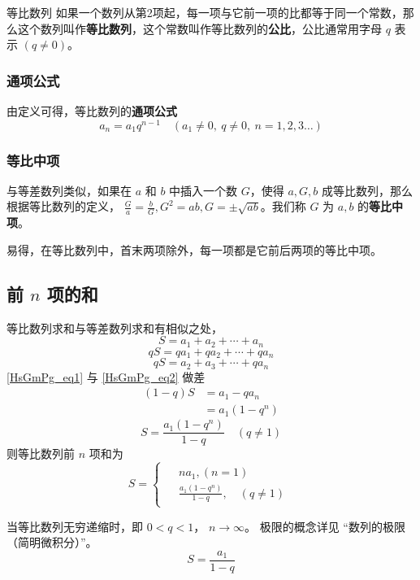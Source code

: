 

\begin{definition}{等比数列}
如果一个数列从第2项起，每一项与它前一项的比都等于同一个常数，那么这个数列叫作\textbf{等比数列}，这个常数叫作等比数列的\textbf{公比}，公比通常用字母 $q$ 表示 $(q\ne 0)$。
\end{definition}

\subsubsection{通项公式}
由定义可得，等比数列的\textbf{通项公式}
\begin{equation}
a_n = a_1 q^{n-1} \quad (a_1 \ne 0,\ q\ne 0,\ n=1,2,3\dots)
\end{equation}

\subsubsection{等比中项}
与等差数列类似，如果在 $a$ 和 $b$ 中插入一个数 $G$，使得 $a,G,b$ 成等比数列，那么根据等比数列的定义， $\frac{G}{a} = \frac{b}{G},G^2 = ab,G = \pm \sqrt{ab}$。我们称 $G$ 为 $a,b$ 的\textbf{等比中项}。

易得，在等比数列中，首末两项除外，每一项都是它前后两项的等比中项。

\subsection{前 $n$ 项的和}
等比数列求和与等差数列求和有相似之处，
\begin{equation}\label{HsGmPg_eq1}
S = a_1 + a_2 + \cdots + a_n
\end{equation}
\begin{equation}
qS = qa_1 + qa_2 + \cdots + qa_n
\end{equation}
\begin{equation}\label{HsGmPg_eq2}
qS= a_2 + a_3 + \cdots + qa_n
\end{equation}
\autoref{HsGmPg_eq1} 与 \autoref{HsGmPg_eq2} 做差
\begin{equation}
\begin{aligned}
(1 - q)S &= a_1 - qa_n\\
&= a_1(1 - q^n)
\end{aligned}
\end{equation}
\begin{equation}
S = \frac{a_1(1-q^n)}{1-q} \quad (q\neq 1)
\end{equation}
则等比数列前 $n$ 项和为
\begin{equation}
S = 
\begin{cases}
\begin{aligned}
&na_1,(n = 1) \\
&\frac{a_1(1-q^n)}{1-q},\quad (q \neq 1)
\end{aligned}
\end{cases}
\end{equation}

当等比数列无穷递缩时，即 $0<q<1$， $n\rightarrow \infty$。 极限的概念详见 “数列的极限（简明微积分）”。
\begin{equation}
S = \frac{a_1}{1 - q}
\end{equation}
